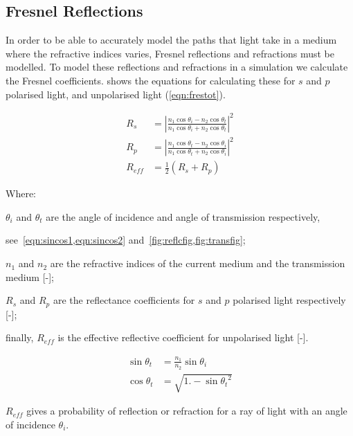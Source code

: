 \begin{appendices}
\chapter{Fresnel Reflections}
\label{app:fresnelappend}

In order to be able to accurately model the paths that light take in a medium where the refractive indices varies, Fresnel reflections and refractions must be modelled.
To model these reflections and refractions in a simulation we calculate the Fresnel coefficients.
 shows the equations for calculating these for $s$ and $p$ polarised light, and unpolarised light (\cref{eqn:frestot}).


\begin{align}
R_s&=\left|\frac{n_1 \cos\theta_i-n_2\cos\theta_t}{n_1\cos\theta_i+n_2\cos\theta_t}\right|^2\label{eqn:fres1}\\
R_p&=\left|\frac{n_1 \cos\theta_t-n_2\cos\theta_i}{n_1\cos\theta_t+n_2\cos\theta_i}\right|^2\label{eqn:fres2}\\
R_{eff}&=\tfrac{1}{2}\left(R_s+R_p\right)\label{eqn:frestot}
\end{align}

\noindent Where: 

\indent $\theta_i$ and $\theta_t$ are the angle of incidence and angle of transmission respectively,

\indent see~\cref{eqn:sincos1,eqn:sincos2} and~\cref{fig:reflcfig,fig:transfig};

\indent $n_1$ and $n_2$ are the refractive indices of the current medium and the transmission medium [-];

\indent $R_s$ and $R_p$ are the reflectance coefficients for $s$ and $p$ polarised light respectively [-];

\indent finally, $R_{eff}$ is the effective reflective coefficient for unpolarised light [-].

\medskip

\begin{align}
\sin\theta_t&=\frac{n_1}{n_2}\sin\theta_i\label{eqn:sincos1}\\
\cos\theta_t&=\sqrt{1. - {\sin\theta_t}^2}\label{eqn:sincos2}
\end{align}

$R_{eff}$ gives a probability of reflection or refraction for a ray of light with an angle of incidence $\theta_i$.



\end{appendices}
